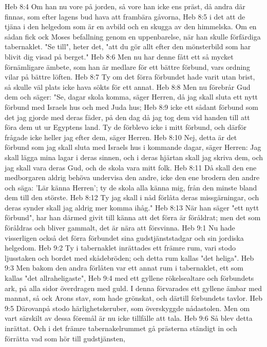 Heb 8:4  Om han nu vore på jorden, så vore han icke ens präst, då andra där finnas, som efter lagens bud hava att frambära gåvorna,
Heb 8:5  i det att de tjäna i den helgedom som är en avbild och en skugga av den himmelska. Om en sådan fick ock Moses befallning genom en uppenbarelse, när han skulle förfärdiga tabernaklet. "Se till", heter det, "att du gör allt efter den mönsterbild som har blivit dig visad på berget."
Heb 8:6  Men nu har denne fått ett så mycket förnämligare ämbete, som han är medlare för ett bättre förbund, vars ordning vilar på bättre löften.
Heb 8:7  Ty om det förra förbundet hade varit utan brist, så skulle väl plats icke hava sökts för ett annat.
Heb 8:8  Men nu förebrår Gud dem och säger: "Se, dagar skola komma, säger Herren, då jag skall sluta ett nytt förbund med Israels hus och med Juda hus;
Heb 8:9  icke ett sådant förbund som det jag gjorde med deras fäder, på den dag då jag tog dem vid handen till att föra dem ut ur Egyptens land. Ty de förblevo icke i mitt förbund, och därför frågade icke heller jag efter dem, säger Herren.
Heb 8:10  Nej, detta är det förbund som jag skall sluta med Israels hus i kommande dagar, säger Herren: Jag skall lägga mina lagar i deras sinnen, och i deras hjärtan skall jag skriva dem, och jag skall vara deras Gud, och de skola vara mitt folk.
Heb 8:11  Då skall den ene medborgaren aldrig behöva undervisa den andre, icke den ene brodern den andre och säga: 'Lär känna Herren'; ty de skola alla känna mig, från den minste bland dem till den störste.
Heb 8:12  Ty jag skall i nåd förlåta deras missgärningar, och deras synder skall jag aldrig mer komma ihåg."
Heb 8:13  När han säger "ett nytt förbund", har han därmed givit till känna att det förra är föråldrat; men det som föråldras och bliver gammalt, det är nära att försvinna.
Heb 9:1  Nu hade visserligen också det förra förbundet sina gudstjänststadgar och sin jordiska helgedom.
Heb 9:2  Ty i tabernaklet inrättades ett främre rum, vari stodo ljusstaken och bordet med skådebröden; och detta rum kallas "det heliga".
Heb 9:3  Men bakom den andra förlåten var ett annat rum i tabernaklet, ett som kallas "det allraheligaste",
Heb 9:4  med ett gyllene rökelsealtare och förbundets ark, på alla sidor överdragen med guld. I denna förvarades ett gyllene ämbar med mannat, så ock Arons stav, som hade grönskat, och därtill förbundets tavlor.
Heb 9:5  Därovanpå stodo härlighetskeruber, som överskyggde nådastolen. Men om vart särskilt av dessa föremål är nu icke tillfälle att tala.
Heb 9:6  Så blev detta inrättat. Och i det främre tabernakelrummet gå prästerna ständigt in och förrätta vad som hör till gudstjänsten,
